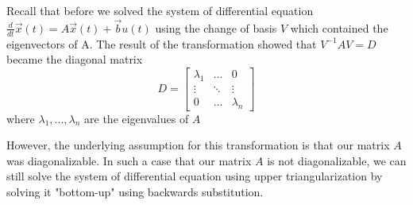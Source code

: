 


Recall that before we solved the system of differential equation $\frac{d}{dt}\vec{x}(t) = A\vec{x}(t) + \vec{b}u(t)$ using 
the change of basis $V$ which contained the eigenvectors of A. The result of the transformation showed that $V^{-1}AV = D$ 
became the diagonal matrix 
\[
  D = \begin{bmatrix}
    \lambda_1 & ... & 0 \\
    \vdots & \ddots & \vdots \\
    0 & ... & \lambda_n
  \end{bmatrix}
\]
where $\lambda_1, ..., \lambda_n$ are the eigenvalues of $A$

However, the underlying assumption for this transformation is that our matrix $A$ was diagonalizable. In such a case that 
our matrix $A$ is not diagonalizable, we can still solve the system of differential equation using upper triangularization by 
solving it "bottom-up" using backwards substitution. 


